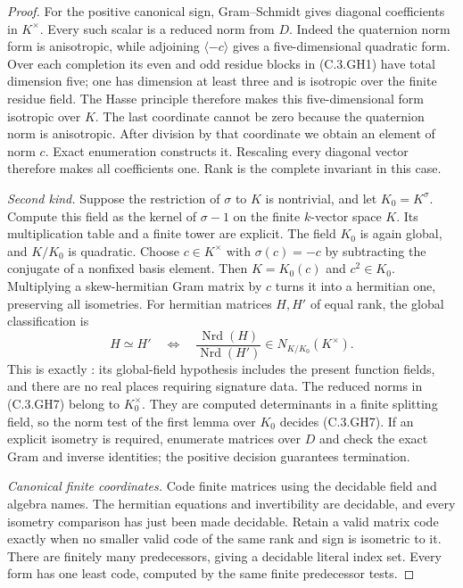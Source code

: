 \begin{proof}
For the positive canonical sign,
Gram--Schmidt gives diagonal
coefficients in $K^\times$.
Every such scalar is a reduced
norm from $D$.
Indeed the quaternion norm form
is anisotropic, while adjoining
$\langle-c\rangle$ gives a
five-dimensional quadratic form.
Over each completion its even
and odd residue blocks in
(C.3.GH1) have total dimension
five; one has dimension at least
three and is isotropic over the
finite residue field.
The Hasse principle therefore
makes this five-dimensional
form isotropic over $K$.
The last coordinate cannot be
zero because the quaternion
norm is anisotropic.
After division by that coordinate
we obtain an element of norm $c$.
Exact enumeration constructs it.
Rescaling every diagonal vector
therefore makes all coefficients
one.  Rank is the complete
invariant in this case.

\emph{Second kind.}
Suppose the restriction of $\sigma$
to $K$ is nontrivial, and let
$K_0=K^\sigma$.
Compute this field as the kernel
of $\sigma-1$ on the finite
$k$-vector space $K$.
Its multiplication table and a
finite tower are explicit.
The field $K_0$ is again global,
and $K/K_0$ is quadratic.
Choose $c\in K^\times$ with
$\sigma(c)=-c$ by subtracting
the conjugate of a nonfixed
basis element.
Then $K=K_0(c)$ and $c^2\in K_0$.
Multiplying a skew-hermitian
Gram matrix by $c$ turns it
into a hermitian one, preserving
all isometries.
For hermitian matrices $H,H'$
of equal rank, the global
classification is
\[
 H\simeq H'
 \quad\Longleftrightarrow\quad
 \frac{\operatorname{Nrd}(H)}
      {\operatorname{Nrd}(H')}
        \in N_{K/K_0}(K^\times).
                                                               \tag{C.3.GH7}
\]
This is exactly
\cite[Section 3, Theorem 3.1 and
Corollary 3.2, pp.\ 18--19]
 {C-LewisUngerVanGeel2004}:
its global-field hypothesis
includes the present function
fields, and there are no real
places requiring signature data.
The reduced norms in (C.3.GH7)
belong to $K_0^\times$.
They are computed determinants
in a finite splitting field,
so the norm test of the first
lemma over $K_0$ decides
(C.3.GH7).
If an explicit isometry is
required, enumerate matrices
over $D$ and check the exact
Gram and inverse identities;
the positive decision guarantees
termination.

\emph{Canonical finite coordinates.}
Code finite matrices using the
decidable field and algebra
names.  The hermitian equations
and invertibility are decidable,
and every isometry comparison
has just been made decidable.
Retain a valid matrix code
exactly when no smaller valid
code of the same rank and sign
is isometric to it.
There are finitely many
predecessors, giving a decidable
literal index set.
Every form has one least code,
computed by the same finite
predecessor tests.


\end{proof}
